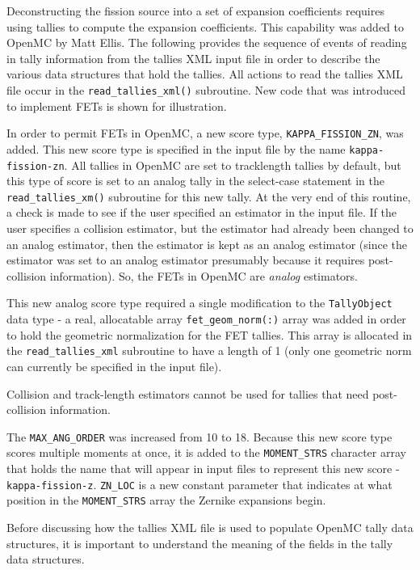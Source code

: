 \documentclass[10pt]{article}
\numberwithin{equation}{section} %
\begin{document}
Deconstructing the fission source into a set of expansion coefficients requires using tallies to compute the expansion coefficients. This capability was added to OpenMC by Matt Ellis. The following provides the sequence of events of reading in tally information from the tallies XML input file in order to describe the various data structures that hold the tallies. All actions to read the tallies XML file occur in the {\tt read\_tallies\_xml()} subroutine. New code that was introduced to implement FETs is shown for illustration.

In order to permit FETs in OpenMC, a new score type, {\tt KAPPA\_FISSION\_ZN}, was added. This new score type is specified in the input file by the name {\tt kappa-fission-zn}. All tallies in OpenMC are set to tracklength tallies by default, but this type of score is set to an analog tally in the select-case statement in the {\tt read\_tallies\_xm()} subroutine for this new tally. At the very end of this routine, a check is made to see if the user specified an estimator in the input file. If the user specifies a collision estimator, but the estimator had already been changed to an analog estimator, then the estimator is kept as an analog estimator (since the estimator was set to an analog estimator presumably because it requires post-collision information). So, the FETs in OpenMC are {\it analog} estimators.

This new analog score type required a single modification to the {\tt TallyObject} data type - a real, allocatable array {\tt fet\_geom\_norm(:)} array was added in order to hold the geometric normalization for the FET tallies. This array is allocated in the {\tt read\_tallies\_xml} subroutine to have a length of 1 (only one geometric norm can currently be specified in the input file). 

Collision and track-length estimators cannot be used for tallies that need post-collision information.

The {\tt MAX\_ANG\_ORDER} was increased from 10 to 18. Because this new score type scores multiple moments at once, it is added to the {\tt MOMENT\_STRS} character array that holds the name that will appear in input files to represent this new score - {\tt kappa-fission-z}. {\tt ZN\_LOC} is a new constant parameter that indicates at what position in the {\tt MOMENT\_STRS} array the Zernike expansions begin.

Before discussing how the tallies XML file is used to populate OpenMC tally data structures, it is important to understand the meaning of the fields in the tally data structures. 
\end{document}
